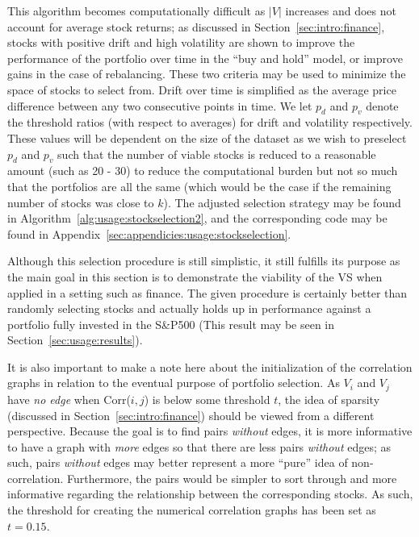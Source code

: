 This algorithm becomes computationally difficult as $|V|$ increases and does 
not account for average stock returns; as discussed in 
Section~\ref{sec:intro:finance}, stocks with positive drift and high volatility 
are shown to improve the performance of the portfolio over time in the ``buy 
and hold'' model, or improve gains in the case of rebalancing. These two 
criteria may be used to minimize the space of stocks to select from. Drift over 
time is simplified as the average price difference between any two consecutive 
points in time. We let $p_d$ and $p_v$ denote the threshold ratios
(with respect to averages) for drift and volatility respectively. These 
values will be dependent on the size of the dataset as we wish to preselect 
$p_d$ and $p_v$ such that the number of viable stocks is reduced to a 
reasonable amount (such as 20 - 30) to reduce the computational burden but not 
so much that the portfolios are all the same (which would be the case if the 
remaining number of stocks was close to $k$). The adjusted selection strategy 
may be found in Algorithm~\ref{alg:usage:stockselection2}, and the 
corresponding code may be found in 
Appendix~\ref{sec:appendicies:usage:stockselection}.

Although this selection procedure is still simplistic, it still fulfills its 
purpose as the main goal in this section is to demonstrate the viability of the 
VS when applied in a setting such as finance. The given procedure is certainly 
better than randomly selecting stocks and actually holds up in performance 
against a portfolio fully invested in the S\&P500 (This result may be seen in 
Section~\ref{sec:usage:results}).

It is also important to make a note here about the initialization of the 
correlation graphs in relation to the eventual purpose of portfolio selection.
As $V_i$ and $V_j$ have \textit{no edge} when Corr($i,j$) is below some 
threshold $t$, the idea of sparsity (discussed in 
Section~\ref{sec:intro:finance}) should be viewed from a different perspective. 
Because the goal is to find pairs \textit{without} edges, it is more 
informative to have a graph with \textit{more} edges so that there are less 
pairs \textit{without} edges; as such, pairs \textit{without} edges may better 
represent a more ``pure'' idea of non-correlation. Furthermore, the pairs 
would be simpler to sort through and more informative regarding the 
relationship between the corresponding stocks. As such, the threshold 
for creating the numerical correlation graphs has been set as $t = 0.15$.

